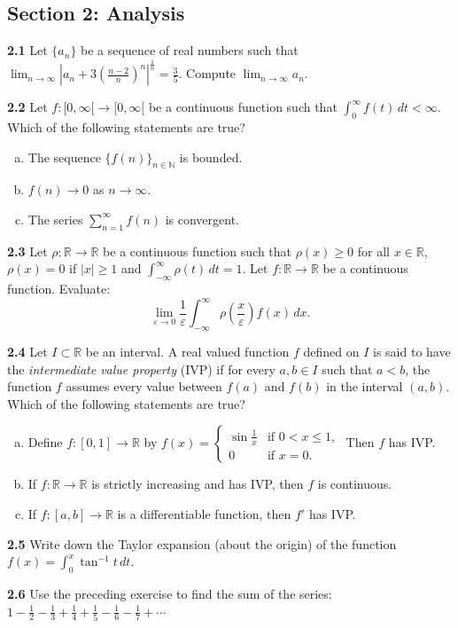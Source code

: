 \documentclass[11pt,a4paper]{article}
\newcommand{\N}{\mathbb{N}}
\newcommand{\R}{\mathbb{R}}
\newcommand{\examsec}[1]{%
  \subsection*{#1}
  \vspace{-2pt}
}
\newcommand{\qitem}[1]{\par\medskip\noindent\textbf{#1}\hspace{0.5em}}
\begin{document}
\examsec{Section 2: Analysis}

\qitem{2.1} Let $\{a_n\}$ be a sequence of real numbers such that $\displaystyle\lim_{n \to \infty} \left|a_n + 3\left(\frac{n-2}{n}\right)^n\right|^{\frac{1}{n}} = \frac{3}{5}$. Compute $\lim_{n \to \infty} a_n$.

\qitem{2.2} Let $f : [0, \infty[ \to [0, \infty[$ be a continuous function such that $\int_0^\infty f(t)\,dt < \infty$. Which of the following statements are true?
\begin{enumerate}[a.]
  \item The sequence $\{f(n)\}_{n \in \N}$ is bounded.
  \item $f(n) \to 0$ as $n \to \infty$.
  \item The series $\sum_{n=1}^{\infty} f(n)$ is convergent.
\end{enumerate}

\qitem{2.3} Let $\rho : \R \to \R$ be a continuous function such that $\rho(x) \ge 0$ for all $x \in \R$, $\rho(x) = 0$ if $|x| \ge 1$ and $\int_{-\infty}^{\infty} \rho(t)\,dt = 1$. Let $f : \R \to \R$ be a continuous function. Evaluate:
\[
  \lim_{\varepsilon \to 0} \frac{1}{\varepsilon}\int_{-\infty}^{\infty} \rho\left(\frac{x}{\varepsilon}\right)f(x)\,dx.
\]

\qitem{2.4} Let $I \subset \R$ be an interval. A real valued function $f$ defined on $I$ is said to have the \emph{intermediate value property} (IVP) if for every $a, b \in I$ such that $a < b$, the function $f$ assumes every value between $f(a)$ and $f(b)$ in the interval $(a, b)$. Which of the following statements are true?
\begin{enumerate}[a.]
  \item Define $f : [0, 1] \to \R$ by $f(x) = \begin{cases} \sin\frac{1}{x} & \text{if } 0 < x \le 1, \\ 0 & \text{if } x = 0. \end{cases}$ Then $f$ has IVP.
  \item If $f : \R \to \R$ is strictly increasing and has IVP, then $f$ is continuous.
  \item If $f : [a, b] \to \R$ is a differentiable function, then $f'$ has IVP.
\end{enumerate}

\qitem{2.5} Write down the Taylor expansion (about the origin) of the function $f(x) = \int_0^x \tan^{-1} t\,dt$.

\qitem{2.6} Use the preceding exercise to find the sum of the series: $1 - \frac{1}{2} - \frac{1}{3} + \frac{1}{4} + \frac{1}{5} - \frac{1}{6} - \frac{1}{7} + \cdots$
\end{document}
